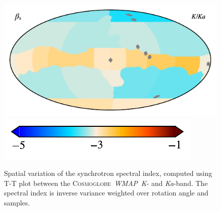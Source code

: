 \documentclass[twocolumn]{../../common/aa}
\def\WMAP{\emph{WMAP}}
\newcommand{\Cosmoglobe}{\textsc{Cosmoglobe}}
\newcommand{\K}[0]{\textit K}
\newcommand{\Ka}[0]{\textit{Ka}}
\begin{document}
\begin{figure}
	\centering
	\includegraphics{figures/TT_map_CG_KKa.pdf}\vspace{-0.25cm}\\
	\hspace{0.25cm}\includegraphics{figures/cbar_beta_wide.pdf}
	\caption{Spatial variation of the synchrotron spectral index, computed using T-T plot between the \Cosmoglobe\ \WMAP\ \K- and \Ka-band. The spectral index is inverse variance weighted over rotation angle and samples.}
        \label{fig:beta_map}
\end{figure}


\end{document}
